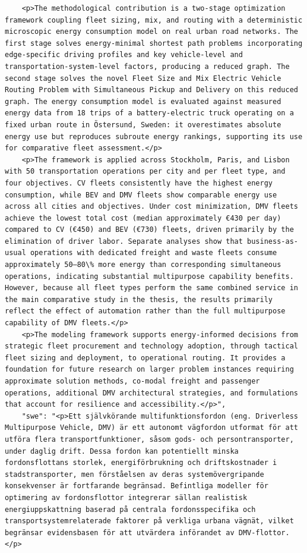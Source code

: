 \begin{casestudySection}
\begin{lstlisting}
    <p>The methodological contribution is a two-stage optimization framework coupling fleet sizing, mix, and routing with a deterministic microscopic energy consumption model on real urban road networks. The first stage solves energy-minimal shortest path problems incorporating edge-specific driving profiles and key vehicle-level and transportation-system-level factors, producing a reduced graph. The second stage solves the novel Fleet Size and Mix Electric Vehicle Routing Problem with Simultaneous Pickup and Delivery on this reduced graph. The energy consumption model is evaluated against measured energy data from 18 trips of a battery-electric truck operating on a fixed urban route in Östersund, Sweden: it overestimates absolute energy use but reproduces subroute energy rankings, supporting its use for comparative fleet assessment.</p>
    <p>The framework is applied across Stockholm, Paris, and Lisbon with 50 transportation operations per city and per fleet type, and four objectives. CV fleets consistently have the highest energy consumption, while BEV and DMV fleets show comparable energy use across all cities and objectives. Under cost minimization, DMV fleets achieve the lowest total cost (median approximately €430 per day) compared to CV (€450) and BEV (€730) fleets, driven primarily by the elimination of driver labor. Separate analyses show that business-as-usual operations with dedicated freight and waste fleets consume approximately 50–80\% more energy than corresponding simultaneous operations, indicating substantial multipurpose capability benefits. However, because all fleet types perform the same combined service in the main comparative study in the thesis, the results primarily reflect the effect of automation rather than the full multipurpose capability of DMV fleets.</p>
    <p>The modeling framework supports energy-informed decisions from strategic fleet procurement and technology adoption, through tactical fleet sizing and deployment, to operational routing. It provides a foundation for future research on larger problem instances requiring approximate solution methods, co-modal freight and passenger operations, additional DMV architectural strategies, and formulations that account for resilience and accessibility.</p>",
    "swe": "<p>Ett självkörande multifunktionsfordon (eng. Driverless Multipurpose Vehicle, DMV) är ett autonomt vägfordon utformat för att utföra flera transportfunktioner, såsom gods- och persontransporter, under daglig drift. Dessa fordon kan potentiellt minska fordonsflottans storlek, energiförbrukning och driftskostnader i stadstransporter, men förståelsen av deras systemövergripande konsekvenser är fortfarande begränsad. Befintliga modeller för optimering av fordonsflottor integrerar sällan realistisk energiuppskattning baserad på centrala fordonsspecifika och transportsystemrelaterade faktorer på verkliga urbana vägnät, vilket begränsar evidensbasen för att utvärdera införandet av DMV-flottor.</p>

\end{lstlisting}
\end{casestudySection}
